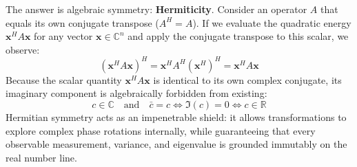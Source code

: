 The answer is algebraic symmetry: \textbf{Hermiticity}. Consider an operator $A$ that equals its own conjugate transpose ($A^H = A$). If we evaluate the quadratic energy $\mathbf{x}^H A \mathbf{x}$ for any vector $\mathbf{x} \in \mathbb{C}^n$ and apply the conjugate transpose to this scalar, we observe:
\begin{equation}
(\mathbf{x}^H A \mathbf{x})^H = \mathbf{x}^H A^H (\mathbf{x}^H)^H = \mathbf{x}^H A \mathbf{x}
\end{equation}
Because the scalar quantity $\mathbf{x}^H A \mathbf{x}$ is identical to its own complex conjugate, its imaginary component is algebraically forbidden from existing:
\begin{equation}
c \in \mathbb{C} \quad \text{and} \quad \bar{c} = c \iff \Im(c) = 0 \iff c \in \mathbb{R}
\end{equation}
Hermitian symmetry acts as an impenetrable shield: it allows transformations to explore complex phase rotations internally, while guaranteeing that every observable measurement, variance, and eigenvalue is grounded immutably on the real number line.

